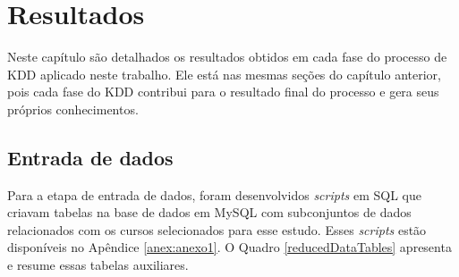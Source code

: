 \chapter{Resultados} \label{resultados}

Neste capítulo são detalhados os resultados obtidos em cada fase do processo de
KDD aplicado neste trabalho. Ele está nas mesmas seções do capítulo anterior,
pois cada fase do KDD contribui para o resultado final do processo e gera seus
próprios conhecimentos.

\section{Entrada de dados}

Para a etapa de entrada de dados, foram desenvolvidos \textit{scripts} em SQL
que criavam tabelas na base de dados em MySQL com subconjuntos de dados
relacionados com os cursos selecionados para esse estudo. Esses \textit{scripts}
estão disponíveis no Apêndice \ref{anex:anexo1}. O Quadro \ref{reducedDataTables}
apresenta e resume essas tabelas auxiliares.

